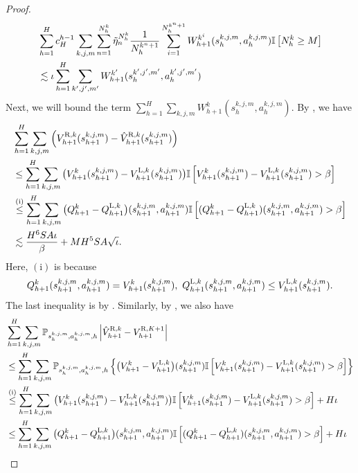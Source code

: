 \documentclass{article}
\newcommand{\LL}{\textnormal{L}}
\newcommand{\R}{\textnormal{R}}
\begin{document}
\begin{proof}
\begin{align}
\label{exchangewmiddle}
    &\sum_{h=1}^H c_H^{h-1}\sum_{k,j,m}\sum_{n=1}^{N_h^k} \Tilde{\eta}_n^{N_h^k}\frac{1}{N_h^{k^n+1}} \sum_{i=1}^{N_h^{k^n+1}}W_{h+1}^{k^i}(s_{h}^{k,j,m},a_{h}^{k,j,m})\mathbb{I}\left[N_h^k\geq M\right] \nonumber\\
    &\lesssim \iota\sum_{h=1}^H\sum_{k',j',m'}W_{h+1}^{k'}(s_{h}^{k',j',m'},a_{h}^{k',j',m'})
\end{align}
Next, we will bound the term $\sum_{h=1}^H\sum_{k,j,m}W_{h+1}^{k}(s_{h}^{k,j,m},a_{h}^{k,j,m})$. By , we have
\begin{align}
\label{w1}
&\sum_{h=1}^H\sum_{k,j,m}\left(V_{{h}+1}^{\R,k}(s_{h+1}^{k,j,m})-\hat{V}_{{h}+1}^{\R,k}(s_{h+1}^{k,j,m})\right) \nonumber\\
&\leq \sum_{h=1}^H\sum_{k,j,m} \big(V_{h+1}^{k}(s_{h+1}^{k,j,m})-V_{h+1}^{\LL, k}(s_{h+1}^{k,j,m})\big) \mathbb{I}\left[V_{h+1}^{k}(s_{h+1}^{k,j,m})-V_{h+1}^{\LL, k}(s_{h+1}^{k,j,m}) > \beta\right] \nonumber\\
&\overset{\mathrm{(i)}}{\leq} \sum_{h=1}^H\sum_{k,j,m} \big(Q_{h+1}^{k}-Q_{h+1}^{\LL, k}\big)(s_{h+1}^{k,j,m},a_{h+1}^{k,j,m}) \mathbb{I}\left[(Q_{h+1}^{k}-Q_{h+1}^{\LL, k})(s_{h+1}^{k,j,m},a_{h+1}^{k,j,m}) > \beta\right] \nonumber\\
&\lesssim \frac{H^6SA\iota}{\beta}+ MH^5SA\sqrt{\iota}. 
\end{align}
Here, $\mathrm{(i)}$ is because $$Q_{h+1}^{k}(s_{h+1}^{k,j,m},a_{h+1}^{k,j,m}) = V_{h+1}^{k}(s_{h+1}^{k,j,m}),\ Q_{h+1}^{\LL, k}(s_{h+1}^{k,j,m},a_{h+1}^{k,j,m}) \leq V_{h+1}^{\LL, k}(s_{h+1}^{k,j,m}).$$ The last inequality is by . Similarly, by , we also have
\begin{align}
\label{w2}
&\sum_{h=1}^H\sum_{k,j,m}\mathbb{P}_{s_h^{k,j,m}, a_h^{k,j,m},h}\left|\hat{V}_{h+1}^{\R,k}-V_{h+1}^{\R,K+1}\right| \nonumber\\
&\leq \sum_{h=1}^H\sum_{k,j,m} \mathbb{P}_{s_h^{k,j,m}, a_h^{k,j,m},h}\left\{\big(V_{h+1}^{k}-V_{h+1}^{\LL, k}\big)(s_{h+1}^{k,j,m}) \mathbb{I}\left[V_{h+1}^{k}(s_{h+1}^{k,j,m})-V_{h+1}^{\LL, k}(s_{h+1}^{k,j,m}) > \beta\right]\right\} \nonumber\\
&\overset{\mathrm{(i)}}{\leq} \sum_{h=1}^H\sum_{k,j,m}\big(V_{h+1}^{k}(s_{h+1}^{k,j,m})-V_{h+1}^{\LL, k}(s_{h+1}^{k,j,m})\big) \mathbb{I}\left[V_{h+1}^{k}(s_{h+1}^{k,j,m})-V_{h+1}^{\LL, k}(s_{h+1}^{k,j,m}) > \beta\right]+H\iota \nonumber\\
&\leq \sum_{h=1}^H\sum_{k,j,m} \big(Q_{h+1}^{k}-Q_{h+1}^{\LL, k}\big)(s_{h+1}^{k,j,m},a_{h+1}^{k,j,m}) \mathbb{I}\left[(Q_{h+1}^{k}-Q_{h+1}^{\LL, k})(s_{h+1}^{k,j,m},a_{h+1}^{k,j,m}) > \beta\right] +H\iota \nonumber\\

\end{align}
\end{proof}
\end{document}
